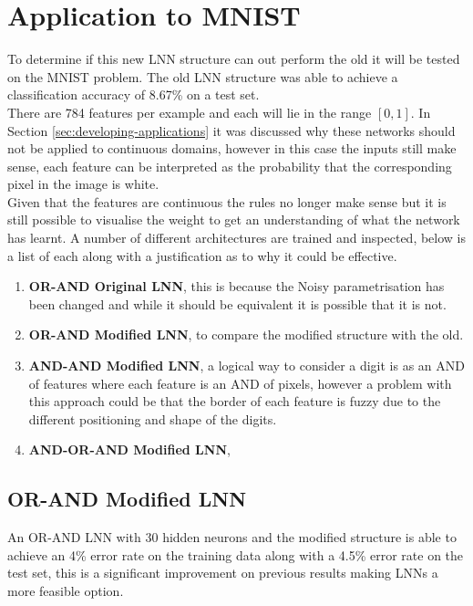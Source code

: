 \section{Application to MNIST}
To determine if this new LNN structure can out perform the old it will be tested on the MNIST problem. The old LNN structure was able to achieve a classification accuracy of 8.67\% on a test set.\\

There are 784 features per example and each will lie in the range $[0, 1]$. In Section \ref{sec:developing-applications} it was discussed why these networks should not be applied to continuous domains, however in this case the inputs still make sense, each feature can be interpreted as the probability that the corresponding pixel in the image is white.\\

Given that the features are continuous the rules no longer make sense but it is still possible to visualise the weight to get an understanding of what the network has learnt. A number of different architectures are trained and inspected, below is a list of each along with a justification as to why it could be effective.

\begin{enumerate}
	\item \textbf{OR-AND Original LNN}, this is because the Noisy parametrisation has been changed and while it should be equivalent it is possible that it is not.
	
	\item \textbf{OR-AND Modified LNN}, to compare the modified structure with the old.
	
	\item \textbf{AND-AND Modified LNN}, a logical way to consider a digit is as an AND of features where each feature is an AND of pixels, however a problem with this approach could be that the border of each feature is fuzzy due to the different positioning and shape of the digits.
	
	\item \textbf{AND-OR-AND Modified LNN},
\end{enumerate}

\subsection{OR-AND Modified LNN}
An OR-AND LNN with 30 hidden neurons and the modified structure is able to achieve an 4\% error rate on the training data along with a 4.5\% error rate on the test set, this is a significant improvement on previous results making LNNs a more feasible option.\\

